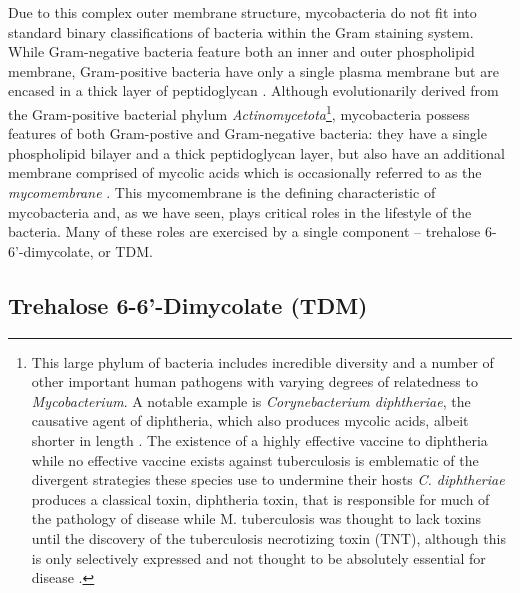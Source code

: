 Due to this complex outer membrane structure, mycobacteria do not fit into standard binary classifications of bacteria within the Gram staining system. While Gram\hyp{}negative bacteria feature both an inner and outer phospholipid membrane, Gram\hyp{}positive bacteria have only a single plasma membrane but are encased in a thick layer of peptidoglycan \citep{Carlone1982, Salton1953}. Although evolutionarily derived from the Gram\hyp{}positive bacterial phylum \textit{Actinomycetota}\footnote{This large phylum of bacteria includes incredible diversity and a number of other important human pathogens with varying degrees of relatedness to \textit{Mycobacterium}. A notable example is \textit{Corynebacterium diphtheriae}, the causative agent of diphtheria, which also produces mycolic acids, albeit shorter in length \citep{vanderPeet2015}. The existence of a highly effective vaccine to diphtheria while no effective vaccine exists against tuberculosis is emblematic of the divergent strategies these species use to undermine their hosts \textit{C. diphtheriae} produces a classical toxin, diphtheria toxin, that is responsible for much of the pathology of disease while M. tuberculosis was thought to lack toxins until the discovery of the tuberculosis necrotizing toxin (TNT), although this is only selectively expressed and not thought to be absolutely essential for disease \citep{Danilchanka2014, Pajuelo2018, Pajuelo2020, Pajuelo2021, Tak2019, Tak2021, IzquierdoLafuente2021, Sun2015}.}, mycobacteria possess features of both Gram\hyp{}postive and Gram\hyp{}negative bacteria: they have a single phospholipid bilayer and a thick peptidoglycan layer, but also have an additional membrane comprised of mycolic acids which is occasionally referred to as the \textit{mycomembrane} \citep{Jankute2015, Brennan2003, Brennan1995, Chatterjee1997}. This mycomembrane is the defining characteristic of mycobacteria and, as we have seen, plays critical roles in the lifestyle of the bacteria. Many of these roles are exercised by a single component -- trehalose 6-6'-dimycolate, or TDM.

\subsection{Trehalose 6\hyp{}6'\hyp{}Dimycolate (TDM)}\label{tdm}

